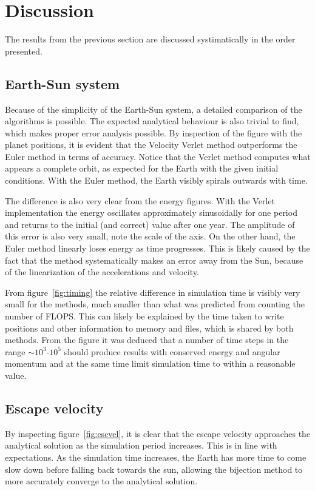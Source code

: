 \documentclass[aps,reprint]{revtex4-1}
\begin{document}
\section{Discussion}
\label{sec:discussion}
The results from the previous section are discussed systimatically in the order
presented.
\subsection{Earth-Sun system}
Because of the simplicity of the Earth-Sun system, a detailed comparison of the
algorithms is possible. The expected analytical behaviour is also trivial to
find, which makes proper error analysis possible. By inspection of the figure with the
planet positions, it is evident that the Velocity Verlet method outperforms
the Euler method in terms of accuracy. Notice that the Verlet method computes what
appears a complete orbit, as expected for the Earth with the given initial conditions.
With the Euler method, the Earth visibly spirals outwards with time.

The difference is also very clear from the energy figures. With the Verlet
implementation the energy oscillates approximately sinusoidally for one period
and returns to the initial (and correct) value after one year. The amplitude of
this error is also very small, note the scale of the axis.
On the other hand, the Euler method linearly loses energy as time progresses. This
is likely caused by the fact that the method systematically makes an error away
from the Sun, because of the linearization of the accelerations and velocity.

From figure~\ref{fig:timing} the relative difference in simulation time is visibly
very small for the methods, much smaller than what was predicted from counting
the number of FLOPS. This can likely be explained by the time taken to write
positions and other information to memory and files, which is shared by both methods.
From the figure it was
deduced that a number of time steps in the range $\sim 10^3$-$10^5$ should produce
results with conserved energy and angular momentum and at the same time limit
simulation time to within a reasonable value.

\subsection{Escape velocity}
By inspecting figure~\ref{fig:escvel}, it is clear that the escape velocity
approaches the analytical solution as the simulation period increases. This is
in line with expectations. As the simulation time increases, the Earth has more
time to come slow down before falling back towards the sun, allowing the
bijection method to more accurately converge to the analytical solution.
\end{document}
